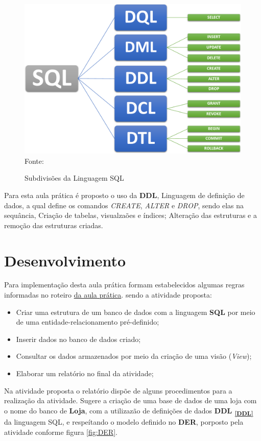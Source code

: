 \begin{figure}[h!]
  \caption{Subdivisões da Linguagem SQL}
  \includegraphics[width=\textwidth]{figure/div_SQL.png}
  \label{fig:div_sql}
  {\fontsize{10pt}{\baselineskip}\selectfont
  Fonte:   }
\end{figure}
\par Para esta aula prática é proposto o uso da \textbf{DDL}, Linguagem de definição de dados, a qual define os comandos \textit{CREATE}, \textit{ALTER} e \textit{DROP}, sendo elas na sequância, Criação de tabelas, visualzaões e índices; Alteração das estruturas e a remoção das estruturas criadas.

\section{Desenvolvimento}
\par Para implementação desta aula prática formam estabelecidos algumas regras informadas no roteiro \href{https://github.com/OgliariNatan/database_and_data_development/blob/main/aula%20pr%C3%A1tica.pdf}{da aula prática}. sendo a atividade proposta:
\begin{itemize}
  \item Criar uma estrutura de um banco de dados com a linguagem \textbf{SQL} por meio de uma entidade-relacionamento pré-definido;
  \item Inserir dados no banco de dados criado;
  \item Consultar os dados armazenados por meio da criação de uma visão (\textit{View});
  \item Elaborar um relatório no final da atividade;
\end{itemize}
\par Na atividade proposta o relatório dispõe de alguns procedimentos para a realização da atividade. Sugere a criação de uma base de dados de uma loja com o nome do banco de \textbf{Loja}, com a utilizazão de definições de dados \textbf{DDL  \textsubscript{\ref{DDL}}} da linguagem SQL, e respeítando o modelo definido no \textbf{DER}, porposto pela atividade conforme figura \ref{fig:DER}.

